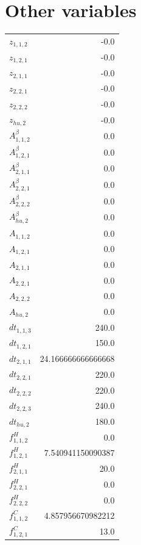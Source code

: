 \documentclass{article}%
\makeatletter
\let\mcnewpage=\newpage%
\newcommand{\TrickSupertabularIntoMulticols}{%
\renewcommand\newpage{%
\if@firstcolumn%
\hrule width\linewidth height0pt%
\columnbreak%
\else%
\mcnewpage%
\fi%
}%
}%
\makeatother
\begin{document}
\section{Other variables}%
\thispagestyle{plain}%
\begin{multicols*}{3}%
\TrickSupertabularIntoMulticols%
%
\begin{supertabular}{lr}%
	$z_{1,1,2}$ & -0.0 \\%
	$z_{1,2,1}$ & -0.0 \\%
	$z_{2,1,1}$ & -0.0 \\%
	$z_{2,2,1}$ & -0.0 \\%
	$z_{2,2,2}$ & -0.0 \\%
	$z_{hu,2}$ & -0.0 \\%
	$A_{1,1,2}^{\beta}$ & 0.0 \\%
	$A_{1,2,1}^{\beta}$ & 0.0 \\%
	$A_{2,1,1}^{\beta}$ & 0.0 \\%
	$A_{2,2,1}^{\beta}$ & 0.0 \\%
	$A_{2,2,2}^{\beta}$ & 0.0 \\%
	$A_{hu,2}^{\beta}$ & 0.0 \\%
	$A_{1,1,2}$ & 0.0 \\%
	$A_{1,2,1}$ & 0.0 \\%
	$A_{2,1,1}$ & 0.0 \\%
	$A_{2,2,1}$ & 0.0 \\%
	$A_{2,2,2}$ & 0.0 \\%
	$A_{hu,2}$ & 0.0 \\%
	$dt_{1,1,3}$ & 240.0 \\%
	$dt_{1,2,1}$ & 150.0 \\%
	$dt_{2,1,1}$ & 24.166666666666668 \\%
	$dt_{2,2,1}$ & 220.0 \\%
	$dt_{2,2,2}$ & 220.0 \\%
	$dt_{2,2,3}$ & 240.0 \\%
	$dt_{hu,2}$ & 180.0 \\%
	$f_{1,1,2}^{H}$ & 0.0 \\%
	$f_{1,2,1}^{H}$ & 7.540941150090387 \\%
	$f_{2,1,1}^{H}$ & 20.0 \\%
	$f_{2,2,1}^{H}$ & 0.0 \\%
	$f_{2,2,2}^{H}$ & 0.0 \\%
	$f_{1,1,2}^{C}$ & 4.857956670982212 \\%
	$f_{1,2,1}^{C}$ & 13.0 \\%

\end{supertabular}
\end{multicols*}
\end{document}
